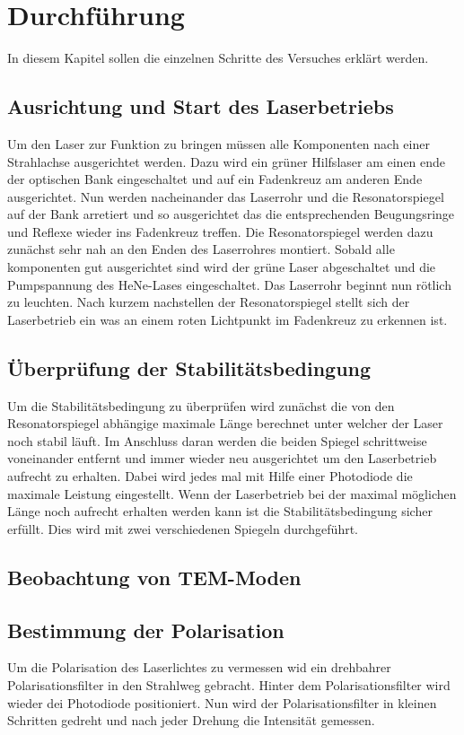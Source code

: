 \section{Durchführung}
\label{sec:Durchfuehrung}
In diesem Kapitel sollen die einzelnen Schritte des Versuches erklärt werden.
\subsection{Ausrichtung und Start des Laserbetriebs}
\label{sec:ausrichtung}
Um den Laser zur Funktion zu bringen müssen alle Komponenten nach einer Strahlachse ausgerichtet werden.
Dazu wird ein grüner Hilfslaser am einen ende der optischen Bank eingeschaltet und auf ein Fadenkreuz 
am anderen Ende ausgerichtet. Nun werden nacheinander das Laserrohr und die Resonatorspiegel auf der
Bank arretiert und so ausgerichtet das die entsprechenden Beugungsringe und Reflexe wieder ins Fadenkreuz 
treffen. Die Resonatorspiegel werden dazu zunächst sehr nah an den Enden des Laserrohres montiert.
Sobald alle komponenten gut ausgerichtet sind wird der grüne Laser abgeschaltet und die Pumpspannung des 
HeNe-Lases eingeschaltet. Das Laserrohr beginnt nun rötlich zu leuchten. Nach kurzem nachstellen der 
Resonatorspiegel stellt sich der Laserbetrieb ein was an einem roten Lichtpunkt im Fadenkreuz zu erkennen ist.

\subsection{Überprüfung der Stabilitätsbedingung}
\label{sec:stabilitaetsbedingung}
Um die Stabilitätsbedingung zu überprüfen wird zunächst die von den Resonatorspiegel abhängige maximale 
Länge berechnet unter welcher der Laser noch stabil läuft. Im Anschluss daran werden die beiden Spiegel 
schrittweise voneinander entfernt und immer wieder neu ausgerichtet um den Laserbetrieb aufrecht zu erhalten.
Dabei wird jedes mal mit Hilfe einer Photodiode die maximale Leistung eingestellt.
Wenn der Laserbetrieb bei der maximal möglichen Länge noch aufrecht erhalten werden kann ist die 
Stabilitätsbedingung sicher erfüllt. Dies wird mit zwei verschiedenen Spiegeln durchgeführt.

\subsection{Beobachtung von TEM-Moden}
\label{sec:temmoden}

\subsection{Bestimmung der Polarisation}
\label{sec:polarisation}
Um die Polarisation des Laserlichtes zu vermessen wid ein drehbahrer Polarisationsfilter in den Strahlweg 
gebracht. Hinter dem Polarisationsfilter wird wieder dei Photodiode positioniert. Nun wird der
Polarisationsfilter in kleinen Schritten gedreht und nach jeder Drehung die Intensität gemessen.

